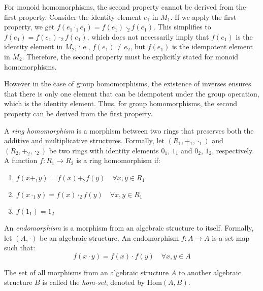 \documentclass[
	11pt, %
	fleqn, %
	a4paper, %
]{LegrandOrangeBook}
\newcommand{\Hom}[2]{\text{Hom}(#1, #2)} %
\begin{document}
\begin{remark}
    For monoid homomorphisms, the second property cannot be derived from the first property. Consider the identity element $e_1$ in $M_1$. If we apply the first property, we get $f(e_1 \cdot_1 e_1) = f(e_1) \cdot_2 f(e_1)$. This simplifies to $f(e_1) = f(e_1) \cdot_2 f(e_1)$, which does not necessarily imply that $f(e_1)$ is the identity element in $M_2$, i.e., $f(e_1) \neq e_2$, but $f(e_1)$ is the idempotent element in $M_2$. Therefore, the second property must be explicitly stated for monoid homomorphisms.

    However in the case of group homomorphisms, the existence of inverses ensures that there is only one element that can be idempotent under the group operation, which is the identity element. Thus, for group homomorphisms, the second property can be derived from the first property.
\end{remark}

\begin{definition}
    A \emph{ring homomorphism} is a morphism between two rings that preserves both the additive and multiplicative structures. Formally, let $(R_1, +_1, \cdot_1)$ and $(R_2, +_2, \cdot_2)$ be two rings with identity elements $0_1$, $1_1$ and $0_2$, $1_2$, respectively. A function $f: R_1 \to R_2$ is a ring homomorphism if:
    \begin{enumerate}
        \item $f(x +_1 y) = f(x) +_2 f(y) \quad \forall x, y \in R_1$
        \item $f(x \cdot_1 y) = f(x) \cdot_2 f(y) \quad \forall x, y \in R_1$
        \item $f(1_1) = 1_2$
    \end{enumerate}    
\end{definition}

\begin{definition}[Endomorphism]
    An \emph{endomorphism} is a morphism from an algebraic structure to itself. Formally, let $(A, \cdot)$ be an algebraic structure. An endomorphism $f: A \to A$ is a set map such that:
    \[
        f(x \cdot y) = f(x) \cdot f(y) \quad \forall x, y \in A
    \]
\end{definition}

\begin{definition}
    The set of all morphisms from an algebraic structure $A$ to another algebraic structure $B$ is called the \emph{hom-set}, denoted by $\Hom{A}{B}$. 
\end{definition}
\end{document}
